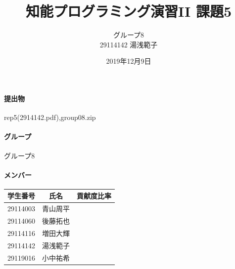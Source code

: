 \documentclass[12pt]{jarticle}
\title{知能プログラミング演習II 課題5}
\author{グループ8\\
  29114142 湯浅範子\\
}
\date{2019年12月9日}
\begin{document}
\maketitle

\paragraph{提出物} rep5(2914142.pdf),group08.zip
\paragraph{グループ} グループ8
\paragraph{メンバー}
\begin{tabular}{|c|c|c|}
  \hline
  学生番号&氏名&貢献度比率\\
  \hline\hline
  29114003&青山周平&\\
  \hline
  29114060&後藤拓也&\\
  \hline
  29114116&増田大輝&\\
  \hline
  29114142&湯浅範子&\\
  \hline
  29119016&小中祐希&\\
  \hline
\end{tabular}
\end{document}
